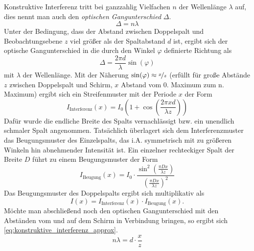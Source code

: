 \documentclass[ngerman]{scrartcl}
\begin{document}
Konstruktive Interferenz tritt bei ganzzahlig Vielfachen $n$ der Wellenlänge $\lambda$ auf, dies nennt man auch den \textit{optischen Gangunterschied} $\Delta$.
\begin{equation}
    \label{eq:konstruktive_interferenz}
    \Delta = n \lambda
\end{equation}
Unter der Bedingung, dass der Abstand zwischen Doppelspalt und Beobachtungsebene $z$ viel größer als der Spaltabstand $d$ ist, ergibt sich der optische Gangunterschied in die durch den Winkel $\varphi$ definierte Richtung als
\begin{equation}
    \label{eq:optischer_gangunterschied}
    \Delta = \frac{2 \pi d}{\lambda} \sin(\varphi)
\end{equation}
mit $\lambda$ der Wellenlänge.
Mit der Näherung $\sin(\varphi) \approx \nicefrac{x}{z}$ (erfüllt für große Abstände $z$ zwischen Doppelspalt und Schirm, $x$ Abstand vom 0. Maximum zum n. Maximum) ergibt sich ein Streifenmuster mit der Periode $x$ der Form
\begin{equation}
    \label{eq:intensity_interferenz}
    I_{\text{Interferenz}}(x) = I_0 \left(1 + \cos(\frac{2 \pi x d}{\lambda z}) \right)
\end{equation}
Dafür wurde die endliche Breite des Spalts vernachlässigt bzw. ein unendlich schmaler Spalt angenommen. Tatsächlich überlagert sich dem Interferenzmuster das Beugungsmuster des Einzelspalts, das i.A. symmetrisch mit zu größeren Winkeln hin abnehmender Intensität ist. Ein einzelner rechteckiger Spalt der Breite $D$ führt zu einem Beugungsmuster der Form
\begin{equation}
    \label{eq:intensity_beugung}
    I_{\text{Beugung}}(x) = I_0 \cdot \frac{\sin^2(\frac{\pi D x}{\lambda z})}{\left(\frac{\pi D x}{\lambda z}\right)^2}
\end{equation}
Das Beugungsmuster des Doppelspalts ergibt sich multiplikativ als
\begin{equation}
    \label{eq:intensity_gesamt}
    I(x) = I_{\text{Interferenz}}(x) \cdot I_{\text{Beugung}}(x).
\end{equation}
Möchte man abschließend noch den optischen Gangunterschied mit den Abständen vom und auf dem Schirm in Verbindung bringen, so ergibt sich \autoref{eq:konstruktive_interferenz_approx}.
\begin{equation}
    \label{eq:konstruktive_interferenz_approx}
    n \lambda = d \cdot \frac{x}{z}
\end{equation}
\end{document}
